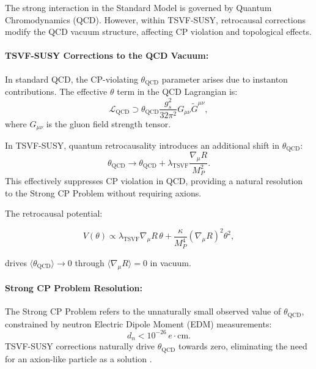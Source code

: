 \documentclass[twocolumn,superscriptaddress,floatfix]{revtex4-2}
\begin{document}
The strong interaction in the Standard Model is governed by Quantum Chromodynamics (QCD). However, within TSVF-SUSY, retrocausal corrections modify the QCD vacuum structure, affecting CP violation and topological effects.

\paragraph{TSVF-SUSY Corrections to the QCD Vacuum:}
In standard QCD, the CP-violating $\theta_{\text{QCD}}$ parameter arises due to instanton contributions. The effective $\theta$ term in the QCD Lagrangian is:
\begin{equation}
\mathcal{L}_{\text{QCD}} \supset \theta_{\text{QCD}} \frac{g_s^2}{32\pi^2} G_{\mu\nu} \tilde{G}^{\mu\nu},
\end{equation}
where $G_{\mu\nu}$ is the gluon field strength tensor.

In TSVF-SUSY, quantum retrocausality introduces an additional shift in $\theta_{\text{QCD}}$:
\begin{equation}  
\theta_{\text{QCD}} \to \theta_{\text{QCD}} + \lambda_{\text{TSVF}} \frac{\nabla_\mu R}{M_P^2}.  
\label{eq:theta_qcd_tsvf}
\end{equation}
This effectively suppresses CP violation in QCD, providing a natural resolution to the Strong CP Problem without requiring axions.

The retrocausal potential:  

\begin{equation}  
V(\theta) \propto \lambda_{\text{TSVF}}\nabla_\mu R\,\theta + \frac{\kappa}{M_P^4}(\nabla_\mu R)^2\theta^2,  
\end{equation}  

drives $\langle \theta_{\text{QCD}} \rangle \rightarrow 0$ through $\langle \nabla_\mu R \rangle = 0$ in vacuum.  


\paragraph{Strong CP Problem Resolution:}
The Strong CP Problem refers to the unnaturally small observed value of $\theta_{\text{QCD}}$, constrained by neutron Electric Dipole Moment (EDM) measurements:
\begin{equation}
d_n < 10^{-26} \, e \cdot \text{cm}.
\end{equation}
TSVF-SUSY corrections naturally drive $\theta_{\text{QCD}}$ towards zero, eliminating the need for an axion-like particle as a solution \cite{Peccei1977}.
\end{document}
